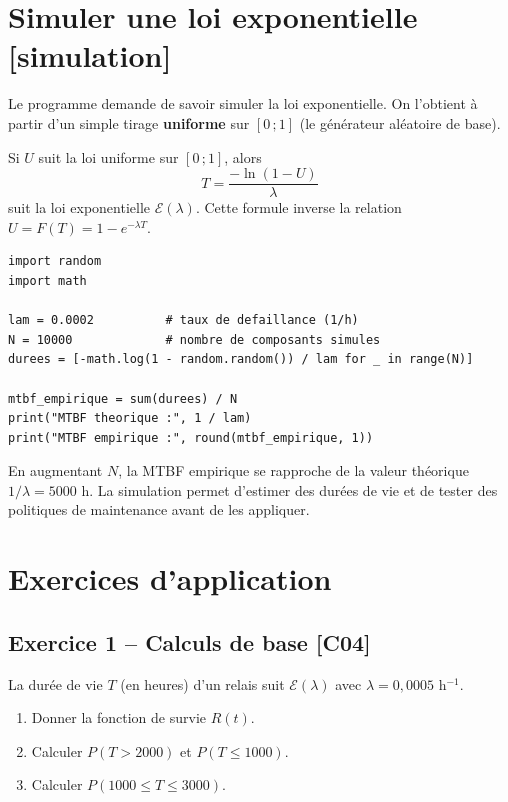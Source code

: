 \documentclass[a4paper,11pt]{article}
\begin{document}
\newpage
\section{Simuler une loi exponentielle \hfill {\normalsize\color{uimmred}[simulation]}}

Le programme demande de savoir simuler la loi exponentielle. On l'obtient à partir d'un simple tirage \textbf{uniforme} sur $[0\,;1]$ (le générateur aléatoire de base).

\begin{methode}
Si $U$ suit la loi uniforme sur $[0\,;1]$, alors
\[
T = \frac{-\ln(1 - U)}{\lambda}
\]
suit la loi exponentielle $\mathcal{E}(\lambda)$. Cette formule inverse la relation $U = F(T) = 1 - e^{-\lambda T}$.
\end{methode}

\begin{lstlisting}[style=uimmpython, caption={Simulation de durées de vie exponentielles et MTBF empirique}]
import random
import math

lam = 0.0002          # taux de defaillance (1/h)
N = 10000             # nombre de composants simules
durees = [-math.log(1 - random.random()) / lam for _ in range(N)]

mtbf_empirique = sum(durees) / N
print("MTBF theorique :", 1 / lam)
print("MTBF empirique :", round(mtbf_empirique, 1))
\end{lstlisting}

\begin{remarque}
En augmentant $N$, la MTBF empirique se rapproche de la valeur théorique $1/\lambda = 5000$ h. La simulation permet d'estimer des durées de vie et de tester des politiques de maintenance avant de les appliquer.
\end{remarque}

\newpage
\section{Exercices d'application}

\subsection*{Exercice 1 -- Calculs de base \hfill {\normalsize\color{uimmred}[C04]}}
La durée de vie $T$ (en heures) d'un relais suit $\mathcal{E}(\lambda)$ avec $\lambda = 0{,}0005$ h$^{-1}$.
\begin{enumerate}[label=\alph*)]
  \item Donner la fonction de survie $R(t)$.
  \item Calculer $P(T > 2000)$ et $P(T \leq 1000)$.
  \item Calculer $P(1000 \leq T \leq 3000)$.
\end{enumerate}
\end{document}
